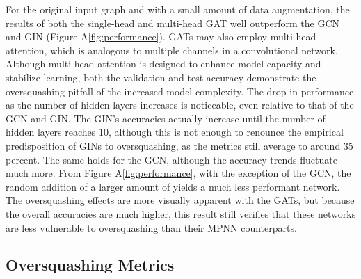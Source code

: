 \documentclass[11pt]{article}
\begin{document}
For the original input graph and with a small amount of data augmentation, the results of both the single-head and multi-head GAT well outperform the GCN and GIN (Figure A\ref{fig:performance}). GATs may also employ multi-head attention, which is analogous to multiple channels in a convolutional network. Although multi-head attention is designed to enhance model capacity and stabilize learning, both the validation and test accuracy demonstrate the oversquashing pitfall of the increased model complexity. The drop in performance as the number of hidden layers increases is noticeable, even relative to that of the GCN and GIN. The GIN's accuracies actually increase until the number of hidden layers reaches 10, although this is not enough to renounce the empirical predisposition of GINs to oversquashing, as the metrics still average to around 35 percent. The same holds for the GCN, although the accuracy trends fluctuate much more. From Figure A\ref{fig:performance}, with the exception of the GCN, the random addition of a larger amount of yields a much less performant network. The oversquashing effects are more visually apparent with the GATs, but because the overall accuracies are much higher, this result still verifies that these networks are less vulnerable to oversquashing than their MPNN counterparts.

\subsection{Oversquashing Metrics}
\end{document}
